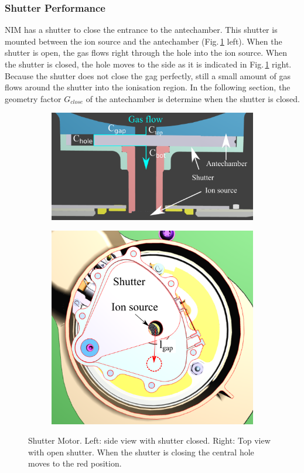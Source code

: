 		\subsubsection{Shutter Performance} \label{subsubsec:motorflow}
		NIM has a shutter to close the entrance to the antechamber. This shutter is mounted between the ion source and the antechamber (Fig.\,\ref{fig:shutterMotor} left). When the shutter is open, the gas flows right through the hole into the ion source. When the shutter is closed, the hole moves to the side as it is indicated in Fig.\,\ref{fig:shutterMotor} right. Because the shutter does not close the gag perfectly, still a small amount of gas flows around the shutter into the ionisation region. In the following section, the geometry factor $G_{close}$ of the antechamber is determine when the shutter is closed.\\
		\begin{figure}[h!]
			\begin{subfigure}{0.5\textwidth}
				\centering
				\includegraphics[width=\textwidth]{Bilder/Shutter_sideview.png}
			\end{subfigure}
			\begin{subfigure}{0.5\textwidth}
				\centering
				\includegraphics[width=.8\textwidth]{Bilder/Shutter_topview.png}
			\end{subfigure}
		\caption{Shutter Motor. Left: side view with shutter closed. Right: Top view with open shutter. When the shutter is closing the central hole moves to the red position.}
		\label{fig:shutterMotor}
		\end{figure}
